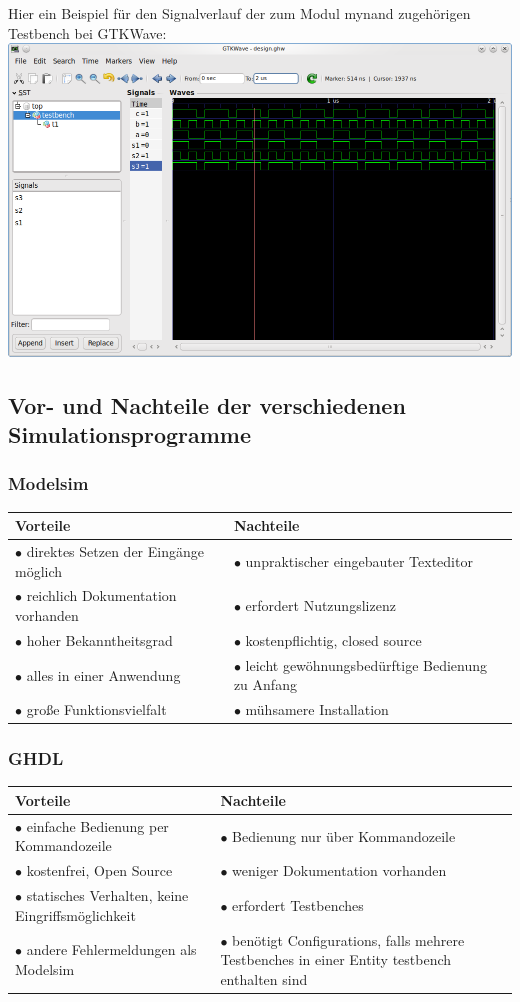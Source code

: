 \documentclass[a4paper, 11pt]{article}
\theoremstyle{definition}
\theoremstyle{plain}
\begin{document}
Hier ein Beispiel für den Signalverlauf der zum Modul mynand zugehörigen Testbench bei GTKWave:
\newline
\includegraphics[width = 1\textwidth]{gtkwave_mynand.png}

\subsection{Vor- und Nachteile der verschiedenen Simulationsprogramme}

\subsubsection{Modelsim}

\begin{tabular}{p{7cm}|p{7cm}}
\textbf{Vorteile} & \textbf{Nachteile} \\
\hline 
$\bullet$ direktes Setzen der Eingänge möglich & $\bullet$ unpraktischer eingebauter Texteditor \\
$\bullet$ reichlich Dokumentation vorhanden & $\bullet$ erfordert Nutzungslizenz \\
$\bullet$ hoher Bekanntheitsgrad & $\bullet$ kostenpflichtig, closed source \\
$\bullet$ alles in einer Anwendung & $\bullet$ leicht gewöhnungsbedürftige Bedienung zu Anfang \\
$\bullet$ große Funktionsvielfalt & $\bullet$ mühsamere Installation
\end{tabular}

\subsubsection{GHDL}

\begin{tabular}{p{7cm}|p{7cm}}
\textbf{Vorteile} & \textbf{Nachteile} \\
\hline 
$\bullet$ einfache Bedienung per Kommandozeile & $\bullet$ Bedienung nur über Kommandozeile \\
$\bullet$ kostenfrei, Open Source & $\bullet$ weniger Dokumentation vorhanden \\
$\bullet$ statisches Verhalten, keine Eingriffsmöglichkeit & $\bullet$ erfordert Testbenches \\
$\bullet$ andere Fehlermeldungen als Modelsim & $\bullet$ benötigt Configurations, falls mehrere Testbenches in einer Entity testbench enthalten sind
\end{tabular}
\end{document}
